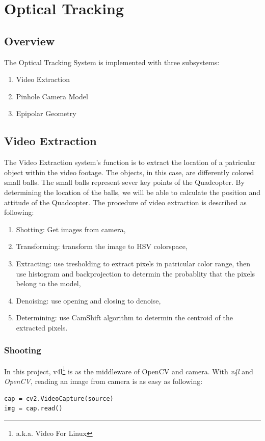 \section{Optical Tracking}
\subsection{Overview}
The Optical Tracking System is implemented with three subsystems:
\begin{enumerate}
  \item Video Extraction
  \item Pinhole Camera Model
  \item Epipolar Geometry
\end{enumerate}
\subsection{Video Extraction}
The Video Extraction system's function is to extract the location of a patricular object within the video footage. The objects, in this case, are differently colored small balls. The small balls represent sever key points of the Quadcopter. By determining the location of the balls, we will be able to calculate the position and attitude of the Quadcopter.
The procedure of video extraction is described as following:
\begin{enumerate}
  \item Shotting: Get images from camera,
  \item Transforming: transform the image to HSV colorspace,
  \item Extracting: use tresholding to extract pixels in patricular color range, then use histogram and backprojection to determin the probablity that the pixels belong to the model,
  \item Denoising: use opening and closing to denoise,
  \item Determining: use CamShift algorithm to determin the centroid of the extracted pixels.
\end{enumerate}
\subsubsection{Shooting}
In this project, v4l\footnote{a.k.a. Video For Linux} is as the middleware of OpenCV and camera. With \emph{v4l} and \emph{OpenCV}, reading an image from camera is as easy as following:
\lstset{language=python}
\begin{lstlisting}
cap = cv2.VideoCapture(source)
img = cap.read()
\end{lstlisting}
